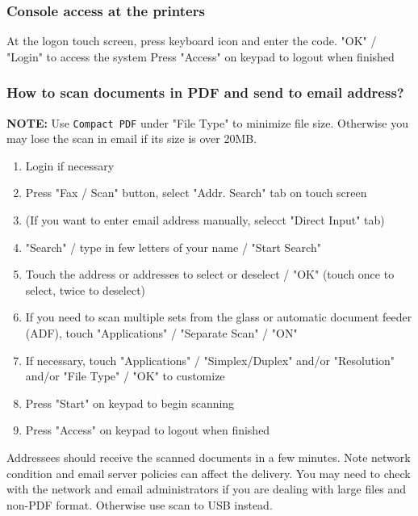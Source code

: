 \documentclass[12pt,a4paper]{article}
\begin{document}
\subsubsection*{Console access at the printers}
At the logon touch screen, press keyboard icon and enter the code.
"OK" / "Login" to access the system
Press "Access" on keypad to logout when finished
\subsubsection*{How to scan documents in PDF and send to email address?}
\textbf{NOTE:} Use \texttt{Compact PDF} under "File Type" to minimize file size. Otherwise you may lose the scan in email if its size is over 20MB.
\begin{enumerate}
    \item Login if necessary
    \item Press "Fax / Scan" button, select "Addr. Search" tab on touch screen
    \item (If you want to enter email address manually, selecct "Direct Input" tab)
    \item "Search" / type in few letters of your name / "Start Search"
    \item Touch the address or addresses to select or deselect / "OK" (touch once to select, twice to deselect)
    \item If you need to scan multiple sets from the glass or automatic document feeder (ADF), touch "Applications" / "Separate Scan" / "ON"
    \item If necessary, touch "Applications" / "Simplex/Duplex" and/or "Resolution" and/or "File Type" / "OK" to customize
    \item Press "Start" on keypad to begin scanning
    \item Press "Access" on keypad to logout when finished
\end{enumerate}
Addressees should receive the scanned documents in a few minutes. Note network condition and email server policies can affect the delivery. You may need to check with the network and email administrators if you are dealing with large files and non-PDF format. Otherwise use scan to USB instead.
\end{document}

